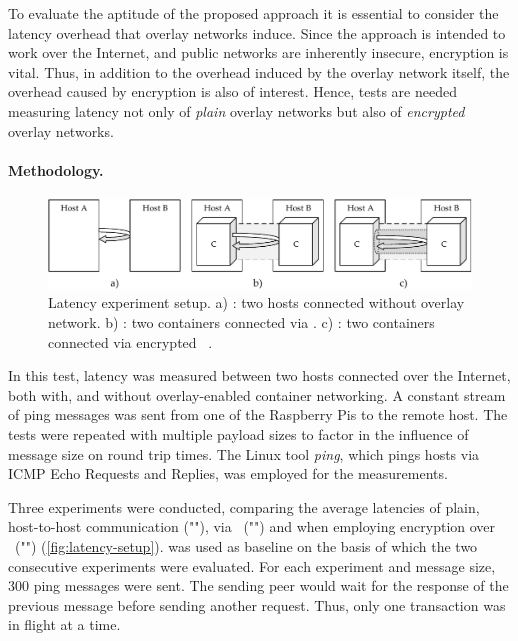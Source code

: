 To evaluate the aptitude of the proposed approach it is essential to consider the latency overhead that overlay networks induce. Since the approach is intended to work over the Internet, and public networks are inherently insecure, encryption is vital. Thus, in addition to the overhead induced by the overlay network itself, the overhead caused by encryption is also of interest. Hence, tests are needed measuring latency not only of \emph{plain} overlay networks but also of \emph{encrypted} overlay networks.


\paragraph{Methodology.} 

\begin{figure}[htpb]
  \centering
  \includegraphics[width=\textwidth]{figures/ping-test}
  \caption[Latency experiment setup]{Latency experiment setup. a) : two hosts connected without overlay network. b) : two containers connected via \wnet . c) : two containers connected via encrypted \wnet\ .}\label{fig:latency-setup}
\end{figure}

In this test, latency was measured between two hosts connected over the Internet, both with, and without overlay-enabled container networking. A constant stream of ping messages was sent from one of the Raspberry Pis to the remote host. The tests were repeated with multiple payload sizes to factor in the influence of message size on round trip times. The Linux tool \emph{ping}, which pings hosts via ICMP Echo Requests and Replies, was employed for the measurements. 

Three experiments were conducted, comparing the average latencies of plain, host-to-host communication (""), via \wnet\ ("") and when employing encryption over \wnet\ ("") (\cf \autoref{fig:latency-setup}).  was used as baseline on the basis of which the two consecutive experiments were evaluated. For each experiment and message size, 300 ping messages were sent. The sending peer would wait for the response of the previous message before sending another request. Thus, only one transaction was in flight at a time.


